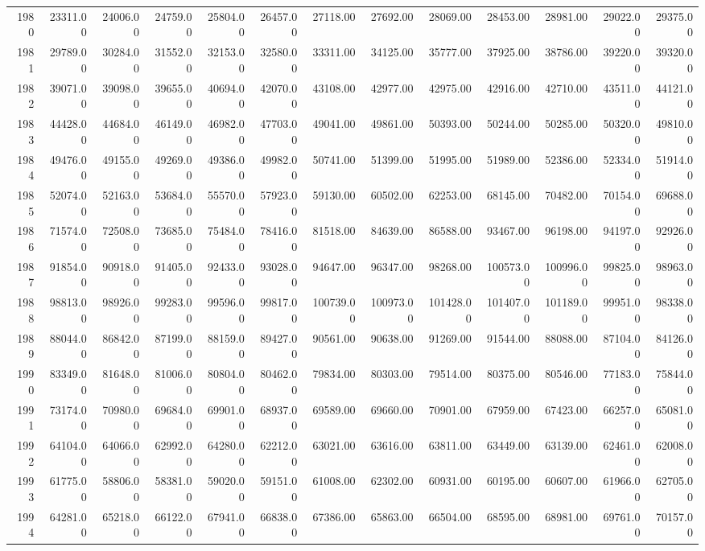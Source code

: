 \begin{longtable}{rrrrrrrrrrrrr}
  1980 & 23311.00 & 24006.00 & 24759.00 & 25804.00 & 26457.00 & 27118.00 & 27692.00 & 28069.00 & 28453.00 & 28981.00 & 29022.00 & 29375.00 \\ 
  1981 & 29789.00 & 30284.00 & 31552.00 & 32153.00 & 32580.00 & 33311.00 & 34125.00 & 35777.00 & 37925.00 & 38786.00 & 39220.00 & 39320.00 \\ 
  1982 & 39071.00 & 39098.00 & 39655.00 & 40694.00 & 42070.00 & 43108.00 & 42977.00 & 42975.00 & 42916.00 & 42710.00 & 43511.00 & 44121.00 \\ 
  1983 & 44428.00 & 44684.00 & 46149.00 & 46982.00 & 47703.00 & 49041.00 & 49861.00 & 50393.00 & 50244.00 & 50285.00 & 50320.00 & 49810.00 \\ 
  1984 & 49476.00 & 49155.00 & 49269.00 & 49386.00 & 49982.00 & 50741.00 & 51399.00 & 51995.00 & 51989.00 & 52386.00 & 52334.00 & 51914.00 \\ 
  1985 & 52074.00 & 52163.00 & 53684.00 & 55570.00 & 57923.00 & 59130.00 & 60502.00 & 62253.00 & 68145.00 & 70482.00 & 70154.00 & 69688.00 \\ 
  1986 & 71574.00 & 72508.00 & 73685.00 & 75484.00 & 78416.00 & 81518.00 & 84639.00 & 86588.00 & 93467.00 & 96198.00 & 94197.00 & 92926.00 \\ 
  1987 & 91854.00 & 90918.00 & 91405.00 & 92433.00 & 93028.00 & 94647.00 & 96347.00 & 98268.00 & 100573.00 & 100996.00 & 99825.00 & 98963.00 \\ 
  1988 & 98813.00 & 98926.00 & 99283.00 & 99596.00 & 99817.00 & 100739.00 & 100973.00 & 101428.00 & 101407.00 & 101189.00 & 99951.00 & 98338.00 \\ 
  1989 & 88044.00 & 86842.00 & 87199.00 & 88159.00 & 89427.00 & 90561.00 & 90638.00 & 91269.00 & 91544.00 & 88088.00 & 87104.00 & 84126.00 \\ 
  1990 & 83349.00 & 81648.00 & 81006.00 & 80804.00 & 80462.00 & 79834.00 & 80303.00 & 79514.00 & 80375.00 & 80546.00 & 77183.00 & 75844.00 \\ 
  1991 & 73174.00 & 70980.00 & 69684.00 & 69901.00 & 68937.00 & 69589.00 & 69660.00 & 70901.00 & 67959.00 & 67423.00 & 66257.00 & 65081.00 \\ 
  1992 & 64104.00 & 64066.00 & 62992.00 & 64280.00 & 62212.00 & 63021.00 & 63616.00 & 63811.00 & 63449.00 & 63139.00 & 62461.00 & 62008.00 \\ 
  1993 & 61775.00 & 58806.00 & 58381.00 & 59020.00 & 59151.00 & 61008.00 & 62302.00 & 60931.00 & 60195.00 & 60607.00 & 61966.00 & 62705.00 \\ 
  1994 & 64281.00 & 65218.00 & 66122.00 & 67941.00 & 66838.00 & 67386.00 & 65863.00 & 66504.00 & 68595.00 & 68981.00 & 69761.00 & 70157.00 \\ 

\end{longtable}
